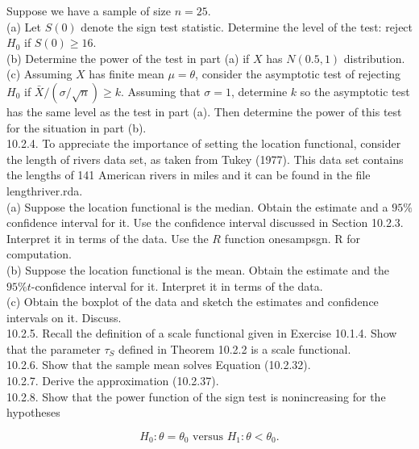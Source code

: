 Suppose we have a sample of size $n=25$.\\
(a) Let $S(0)$ denote the sign test statistic. Determine the level of the test: reject $H_{0}$ if $S(0) \geq 16$.\\
(b) Determine the power of the test in part (a) if $X$ has $N(0.5,1)$ distribution.\\
(c) Assuming $X$ has finite mean $\mu=\theta$, consider the asymptotic test of rejecting $H_{0}$ if $\bar{X} /(\sigma / \sqrt{n}) \geq k$. Assuming that $\sigma=1$, determine $k$ so the asymptotic test has the same level as the test in part (a). Then determine the power of this test for the situation in part (b).\\
10.2.4. To appreciate the importance of setting the location functional, consider the length of rivers data set, as taken from Tukey (1977). This data set contains the lengths of 141 American rivers in miles and it can be found in the file lengthriver.rda.\\
(a) Suppose the location functional is the median. Obtain the estimate and a $95 \%$ confidence interval for it. Use the confidence interval discussed in Section 10.2.3. Interpret it in terms of the data. Use the $R$ function onesampsgn. R for computation.\\
(b) Suppose the location functional is the mean. Obtain the estimate and the $95 \% t$-confidence interval for it. Interpret it in terms of the data.\\
(c) Obtain the boxplot of the data and sketch the estimates and confidence intervals on it. Discuss.\\
10.2.5. Recall the definition of a scale functional given in Exercise 10.1.4. Show that the parameter $\tau_{S}$ defined in Theorem 10.2.2 is a scale functional.\\
10.2.6. Show that the sample mean solves Equation (10.2.32).\\
10.2.7. Derive the approximation (10.2.37).\\
10.2.8. Show that the power function of the sign test is nonincreasing for the hypotheses


\begin{equation*}
H_{0}: \theta=\theta_{0} \text { versus } H_{1}: \theta<\theta_{0} . \tag{10.2.38}
\end{equation*}


